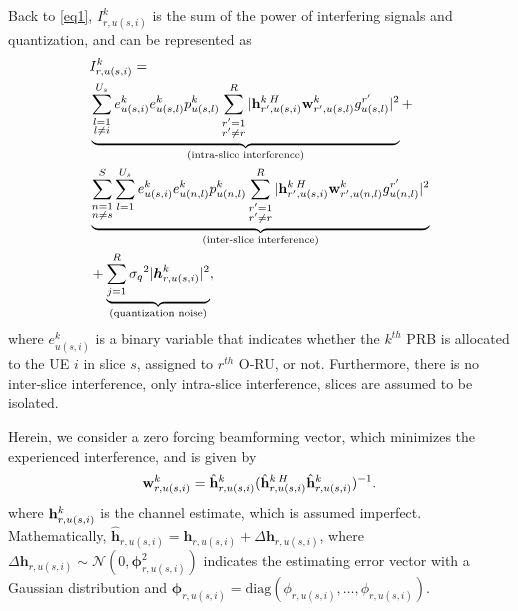\documentclass[lettersize,journal]{IEEEtran}
\begin{document}
Back to \eqref{eq1}, $I_{r,u(s,i)}^{k}$ is the sum of the power of interfering signals and quantization, and can be represented as 
\begin{align}\label{eqI}
&I_{r,u(s,i)}^{k} =\nonumber\\
 &\underbrace{\sum_{\substack{l=1 \\ l\neq i}}^{{U}_{s}} e^{k}_{u(s,i)}e^{k}_{u(s,l)}  p_{u(s,l)}^{k}\sum_{\substack{r'=1 \\ r'\neq r}}^{R}|{\bold{h}_{r',u(s,i)}^{k \: H}} \bold{w}_{r',u(s,l)}^{k} g_{u(s,l)}^{r'}|^2}_{\text{(intra-slice interference)}}+\nonumber\\
&\underbrace{\sum_{\substack{n = 1 \\ n\neq s}}^{S}\sum_{l=1}^{{U}_s} e^{k}_{u(s,i)}e^{k}_{u(n,l)}  p_{u(n,l)}^{k}\sum_{\substack{r'=1 \\ r'\neq r}}^{R}|{\bold{h}_{r',u(s,i)}^{k \: H}} \bold{w}_{r',u(n,l)}^{k} g_{u(n,l)}^{r'}|^2}_{\text{(inter-slice interference)}}\nonumber\\
&+\underbrace{  \sum_{j=1}^{{R}} {\sigma_q}^2 |\boldsymbol{h}_{r,{u(s,i)}}^k|^2 }_{\text{(quantization noise)}},
\end{align}
where $e^{k}_{u(s,i)}$ is a binary variable that indicates whether the $k^{th}$ PRB is allocated to the UE $i$ in slice $s$, assigned to $r^{th}$ O-RU, or not. %
Furthermore, there is no inter-slice interference, only intra-slice interference, slices are assumed to be isolated. 


 Herein, we consider a zero forcing beamforming vector, which minimizes the experienced interference, and is given by \cite{huang2013user}
\begin{equation}
\bold{w}_{r,u(s,i)}^{k} = \hat{\bold{h}}_{r,u(s,i)}^{k}(\hat{\bold{h}}_{r,u(s,i)}^{k \: H} \hat{\bold{h}}_{r,u(s,i)}^{k})^{-1}.
\end{equation}
\noindent where $\bold{h}_{r,u(s,i)}^{k}$ is the channel estimate, which is assumed imperfect. Mathematically,
$\hat{\boldsymbol{h}}_{r,u(s,i)} = \boldsymbol{h}_{r,u(s,i)} + \Delta \boldsymbol{h}_{r,u(s,i)}$, where
$\Delta \boldsymbol{h}_{r,u(s,i)}\sim \mathcal{N}(0,\boldsymbol{\phi}_{r,u(s,i)}^2)$ indicates the estimating error vector with a Gaussian distribution and $\boldsymbol{\phi}_{r,u(s,i)} = \text{diag}(\phi_{r,u(s,i)},\ldots,\phi_{r,u(s,i)}).$
\end{document}
